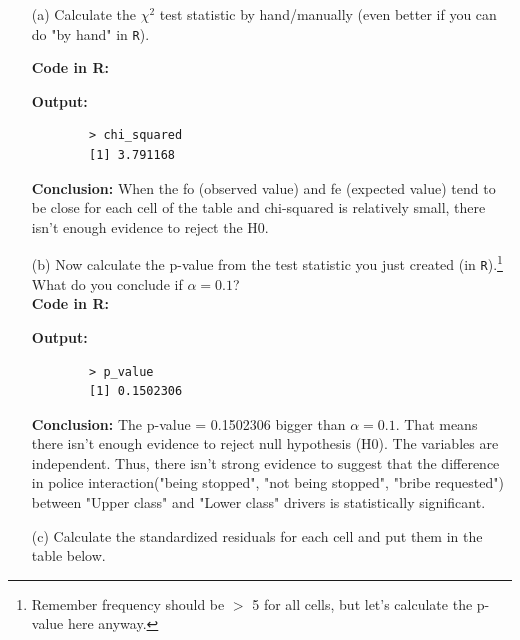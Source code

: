 \documentclass[12pt,letterpaper]{article}
\begin{document}
\begin{enumerate}
	
	\item [(a)]
	Calculate the $\chi^2$ test statistic by hand/manually (even better if you can do "by hand" in \texttt{R}).\\
	\vspace{0.5cm}
	
	\noindent \textbf{Code in R:}
	  
	\vspace{.25cm}
	
	\noindent \textbf{Output: }
	\begin{verbatim}
		> chi_squared
		[1] 3.791168
	\end{verbatim}  
	\vspace{.25cm}
	
	\noindent \textbf{Conclusion:} When the fo (observed value) and fe (expected value) tend to be close for each cell of the table and chi-squared is relatively small, there isn't enough evidence to reject the H0.
	
	\item [(b)]
	Now calculate the p-value from the test statistic you just created (in \texttt{R}).\footnote{Remember frequency should be $>$ 5 for all cells, but let's calculate the p-value here anyway.}  What do you conclude if $\alpha = 0.1$?\\
	
	\noindent \textbf{Code in R:}
	  
	\vspace{.25cm}
	
	\noindent \textbf{Output: }
	\begin{verbatim}
		> p_value
		[1] 0.1502306
	\end{verbatim}  
	\vspace{.25cm}
	
	\noindent \textbf{Conclusion:} The p-value = 0.1502306 bigger than $\alpha = 0.1$. That means there isn't enough evidence to reject null hypothesis (H0). The variables are independent. Thus, there isn't strong evidence to suggest that the difference in police interaction("being stopped", "not being stopped", "bribe requested") between "Upper class" and "Lower class" drivers is statistically significant.      
	

	\item [(c)] Calculate the standardized residuals for each cell and put them in the table below.
	\vspace{1cm}
	

\end{enumerate}
\end{document}
